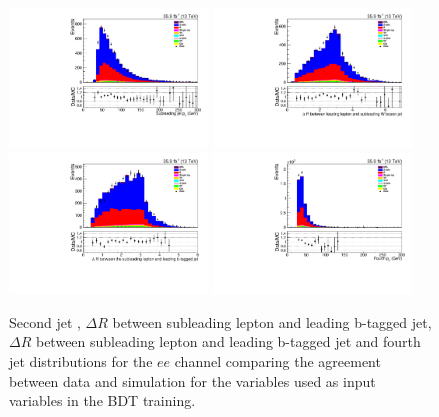 \begin{figure}[!Htb]
\centering
\includegraphics[width=0.47\textwidth]{figs/background-estimation/plots/unblinded/prompt_ee_ttbarInc/secondJetPt_NPL_ee_wMass_ee.pdf}
\includegraphics[width=0.47\textwidth]{figs/background-estimation/plots/unblinded/prompt_ee_ttbarInc/zLep1Quark2DelR_NPL_ee_wMass_ee.pdf}
\\
\includegraphics[width=0.47\textwidth]{figs/background-estimation/plots/unblinded/prompt_ee_ttbarInc/zLep2BjetDelR_NPL_ee_wMass_ee.pdf}
\includegraphics[width=0.47\textwidth]{figs/background-estimation/plots/unblinded/prompt_ee_ttbarInc/fourthJetPt_NPL_ee_wMass_ee.pdf}
\caption{
Second jet \pt, $\Delta R$ between subleading lepton and leading b-tagged jet, $\Delta R$ between subleading lepton and leading b-tagged jet and fourth jet \pT distributions for the $ee$ channel comparing the agreement between data and simulation for the variables used as input variables in the BDT training.}
\label{fig:inputFeaturesDataSimAgreement4}
\end{figure}

